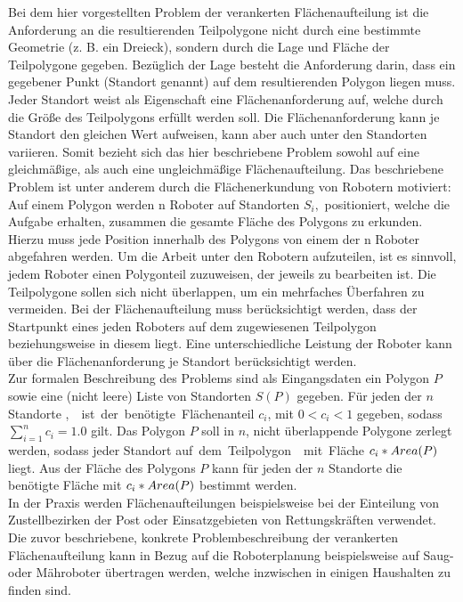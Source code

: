 \documentclass[ngerman]{seminarbeitrag}
\begin{document}
Bei dem hier vorgestellten Problem der verankerten Flächenaufteilung ist die Anforderung an die resultierenden Teilpolygone nicht durch eine bestimmte Geometrie
(z. B. ein Dreieck), sondern durch die Lage und Fläche der Teilpolygone gegeben. Bezüglich der Lage besteht die Anforderung darin, dass ein gegebener Punkt (Standort genannt) auf
dem resultierenden Polygon liegen muss. Jeder Standort weist als Eigenschaft eine Flächenanforderung auf, welche durch die Größe des Teilpolygons erfüllt werden soll. Die
Flächenanforderung kann je Standort den gleichen Wert aufweisen, kann aber auch unter den Standorten variieren. Somit bezieht sich das hier beschriebene Problem sowohl auf eine
gleichmäßige, als auch eine ungleichmäßige Flächenaufteilung. Das beschriebene Problem ist unter anderem durch die Flächenerkundung von Robotern motiviert: \\

Auf einem Polygon werden n Roboter auf Standorten $S_{i},$ \iton positioniert, welche die Aufgabe erhalten, zusammen die gesamte Fläche des Polygons zu
erkunden. Hierzu muss jede Position innerhalb des Polygons von einem der n Roboter abgefahren werden. Um die Arbeit unter den Robotern aufzuteilen, ist es sinnvoll, jedem Roboter einen Polygonteil zuzuweisen, der jeweils zu bearbeiten ist. Die Teilpolygone sollen sich nicht überlappen, um ein mehrfaches Überfahren zu vermeiden. Bei der Flächenaufteilung muss berücksichtigt werden, dass der Startpunkt eines jeden Roboters auf dem zugewiesenen Teilpolygon beziehungsweise in diesem liegt. Eine unterschiedliche Leistung der Roboter kann über die Flächenanforderung je Standort berücksichtigt werden. \\

Zur formalen Beschreibung des Problems sind als Eingangsdaten ein Polygon $P$ sowie eine (nicht leere) Liste von Standorten $S(P)$ gegeben. Für jeden der $n$
Standorte \si, \iton ist der benötigte Flächenanteil $c_{i}$, \iton mit $0 < c_{i} < 1$ gegeben, sodass $\sum_{i=1}^{n}c_{i}=1.0$ gilt. Das Polygon $P$ soll in $n$, nicht
überlappende Polygone zerlegt werden, sodass jeder Standort \si auf dem Teilpolygon \pi mit Fläche $c_{i}* Area(P)$ liegt. Aus der Fläche des Polygons $P$ kann für jeden der $n$ Standorte die benötigte Fläche mit $c_{i}* Area(P)$ bestimmt werden.\\

In der Praxis werden Flächenaufteilungen beispielsweise bei der Einteilung von Zustellbezirken der Post oder Einsatzgebieten von Rettungskräften verwendet. Die zuvor beschriebene, konkrete Problembeschreibung der verankerten Flächenaufteilung kann in Bezug auf die Roboterplanung beispielsweise auf Saug- oder Mähroboter übertragen werden, welche inzwischen in einigen Haushalten zu finden sind.\\
\end{document}

